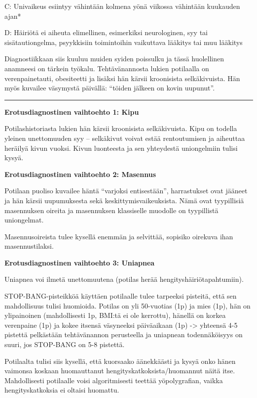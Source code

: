 \documentclass[
]{book}
\begin{document}
C: Univaikeus esiintyy vähintään kolmena yönä viikossa vähintään kuukauden ajan*

D: Häiriötä ei aiheuta elimellinen, esimerkiksi neurologinen, syy tai sisätautiongelma, psyykkisiin toimintoihin vaikuttava lääkitys tai muu lääkitys

Diagnostiikkaan siis kuuluu muiden syiden poissulku ja tässä huolellinen anamneesi on tärkein työkalu. Tehtävänannosta lukien potilaalla on verenpainetauti, obesiteetti ja lisäksi hän kärsii kroonisista selkäkivuista. Hän myös kuvailee väsymystä päivällä: ``töiden jälkeen on kovin uupunut''.

\begin{center}\rule{0.5\linewidth}{0.5pt}\end{center}

\textbf{Erotusdiagnostinen vaihtoehto 1: Kipu}

Potilashistoriasta lukien hän kärsii kroonisista selkäkivuista. Kipu on todella yleinen unettomuuden syy -- selkäkivut voivat estää rentoutumisen ja aiheuttaa heräilyä kivun vuoksi. Kivun luonteesta ja sen yhteydestä uniongelmiin tulisi kysyä.

\textbf{Erotusdiagnostinen vaihtoehto 2: Masennus}

Potilaan puoliso kuvailee häntä ``varjoksi entisestään'', harrastukset ovat jääneet ja hän kärsii uupumuksesta sekä keskittymisvaikeuksista. Nämä ovat tyypillisiä masennuksen oireita ja masennuksen klassiselle muodolle on tyypillistä uniongelmat.

Masennusoireista tulee kysellä enemmän ja selvittää, sopisiko oirekuva ihan masennustilaksi.

\textbf{Erotusdiagnostinen vaihtoehto 3: Uniapnea}

Uniapnea voi ilmetä unettomuutena (potilas herää hengityshäiriötapahtumiin).

STOP-BANG-pisteikköä käyttäen potilaalle tulee tarpeeksi pisteitä, että sen mahdollisuus tulisi huomioida. Potilas on yli 50-vuotias (1p) ja mies (1p), hän on ylipainoinen (mahdollisesti 1p, BMI:tä ei ole kerrottu), hänellä on korkea verenpaine (1p) ja kokee itsensä väsyneeksi päiväaikaan (1p) -\textgreater{} yhteensä 4-5 pistettä pelkästään tehtävänannon perusteella ja uniapnean todennäköisyys on suuri, jos STOP-BANG on 5-8 pistettä.

Potilaalta tulisi siis kysellä, että kuorsaako äänekkäästi ja kysyä onko hänen vaimonsa koskaan huomauttanut hengityskatkoksista/huomannut näitä itse. Mahdollisesti potilaalle voisi algoritmisesti teettää yöpolygrafian, vaikka hengityskatkoksia ei oltaisi huomattu.
\end{document}
